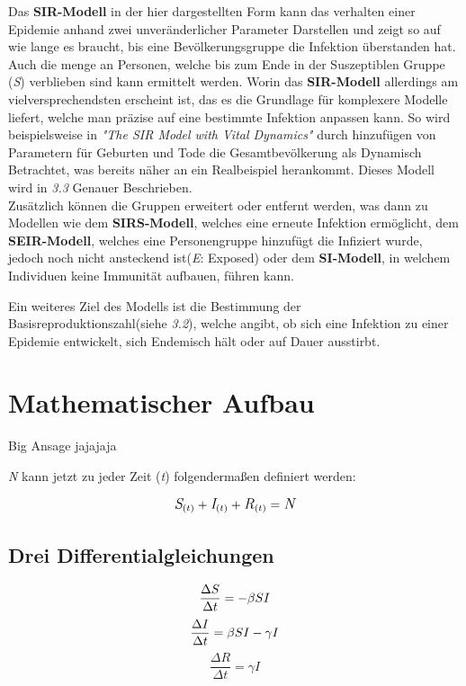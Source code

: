 \documentclass[12pt]{scrartcl} %
\begin{document}
Das \textbf{SIR-Modell} in der hier dargestellten Form kann das verhalten einer Epidemie anhand zwei unveränderlicher Parameter Darstellen und zeigt so auf wie lange es braucht, bis eine Bevölkerungsgruppe die Infektion überstanden hat. Auch die menge an Personen, welche bis zum Ende in der Suszeptiblen Gruppe (\textit{S}) verblieben sind kann ermittelt werden. 
Worin das \textbf{SIR-Modell} allerdings am vielversprechendsten erscheint ist, das es die Grundlage für komplexere Modelle liefert, welche man präzise auf eine bestimmte Infektion anpassen kann.
So wird beispielsweise in \textsl{"The SIR Model with Vital Dynamics"} \cite[s. 132]{5} durch hinzufügen von Parametern für Geburten und Tode die Gesamtbevölkerung als Dynamisch Betrachtet, was bereits näher an ein Realbeispiel herankommt.
Dieses Modell wird in \textsl{3.3} Genauer Beschrieben.\\
Zusätzlich können die Gruppen erweitert oder entfernt werden, was dann zu Modellen wie dem 
\textbf{SIRS-Modell}, welches eine erneute Infektion ermöglicht, dem \textbf{SEIR-Modell}, welches eine Personengruppe hinzufügt die Infiziert wurde, jedoch noch nicht ansteckend ist(\textit{E}: Exposed) oder dem \textbf{SI-Modell}, in welchem Individuen keine Immunität aufbauen, führen kann.

Ein weiteres Ziel des Modells ist die Bestimmung der Basisreproduktionszahl(siehe \textsl{3.2}), welche angibt, ob sich eine Infektion zu einer Epidemie entwickelt, sich Endemisch hält oder auf Dauer ausstirbt. \cite[vgl.]{2}

\newpage
\section{Mathematischer Aufbau}

Big Ansage jajajaja

\textit{N} kann jetzt zu jeder Zeit (\textit{t}) folgendermaßen definiert werden: \cite{3}


$$ \large\textit{S}_{(t)} + \textit{I}_{(t)} + \textit{R}_{(t)} = \textit{N}\normalsize $$


\subsection{Drei Differentialgleichungen}

$$ \frac{\Delta S}{\Delta t} = -\beta\space S I $$
$$ \frac{\Delta I}{\Delta t} = \beta\space S I - \gamma I $$
$$ \frac{\Delta R}{\Delta t} = \gamma I $$
\end{document}
